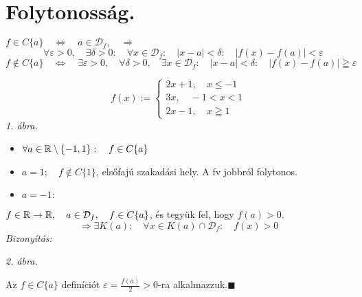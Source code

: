 \documentclass[a4paper,11.5pt]{article}
\begin{document}
	\section{Folytonosság.}
	\begin{revision}
		$f\in C\{a\} \quad \Leftrightarrow\quad a\in\mathcal{D}_f,\quad \Rightarrow$\[\quad \forall\varepsilon>0,\quad \exists\delta>0:\quad \forall x\in\mathcal{D}_f:\quad |x-a|<\delta:\quad |f(x)-f(a)|<\varepsilon \]
		\[f \notin C\{a\}\quad \Leftrightarrow\quad  \exists\varepsilon>0,\quad \forall \delta>0, \quad \exists x\in\mathcal{D}_f:\quad |x-a|<\delta:\quad |f(x)-f(a)|\geqq \varepsilon \]
	\end{revision}
	\begin{task}
		\[ f(x):=\begin{cases}
		2x+1,\quad x\leq -1\\
		3x,\quad -1<x<1\\
		2x-1,\quad x\geqq 1
		\end{cases} \]
		\textit{1. ábra.}
		\begin{itemize}
			\item 
			$\forall a\in\mathbb{R}\setminus\{-1,1\}:\quad f\in C\{a\}$
			\item $a=1;\quad f\notin C\{1\}$, elsőfajú szakadási hely. A fv jobbról folytonos.
			\item $a=-1:$
		\end{itemize}
	\end{task}
	\begin{task}
		$f\in\mathbb{R}\to\mathbb{R},\quad a\in \mathcal{D}_f, \quad f\in C\{a\}$, és tegyük fel, hogy $f(a)>0$.
		\[ \Rightarrow\exists K(a):\quad \forall x\in K(a)\cap \mathcal{D}_f:\quad f(x)>0 \]
		\textit{Bizonyítás:}
		
		\textit{2. ábra.}
		
		Az $f\in C\{a\}$ definíciót $\varepsilon = \frac{f(a)}{2}>0$-ra alkalmazzuk.\quad $\blacksquare$
	\end{task}
\end{document}

